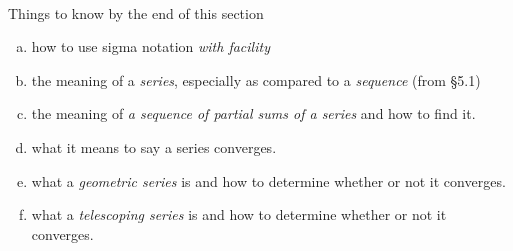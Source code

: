 \documentclass[11pt,fleqn]{article}
\begin{document}
\renewcommand{\headrulewidth}{0pt}
\newcommand{\blank}[1]{\rule{#1}{0.75pt}}
\newcommand{\bc}{\begin{center}}
\newcommand{\ec}{\end{center}}


\vspace*{-0.7in}

\begin{center}
  \large
  \\
   
\end{center}

\footnotesize
Things to know by the end of this section
\begin{multicols}{2}
	\begin{enumerate}[a.]
	\item how to use sigma notation \emph{with facility}
	\item the meaning of a \emph{series}, especially as compared to a \emph{sequence} (from \S 5.1)
	\item the meaning of \emph{a sequence of partial sums of a series} and how to find it.
	\item what it means to say a series converges.
	\item what a \emph{geometric series} is and how to determine whether or not it converges.
	\item what a \emph{telescoping series} is and how to determine whether or not it converges.	
	\end{enumerate}
\end{multicols}
\end{document}
